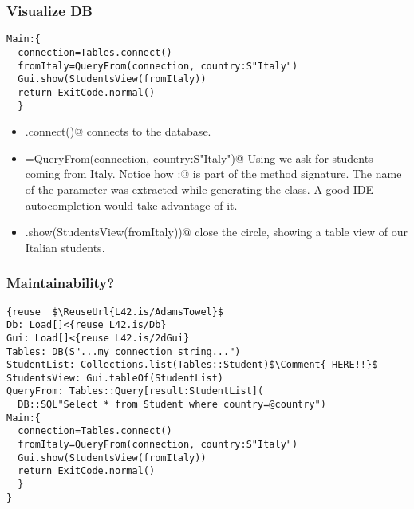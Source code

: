 \begin{frame}[fragile]
\frametitle{Visualize DB}
\begin{NiceCode}{59ex}{1}
\begin{lstlisting}
Main:{
  connection=Tables.connect()
  fromItaly=QueryFrom(connection, country:S"Italy")
  Gui.show(StudentsView(fromItaly))
  return ExitCode.normal()
  }
\end{lstlisting}
\end{NiceCode}
\begin{itemize}
\item \Q@Tables.connect()@ connects to the database.
\item\Q@fromItaly=QueryFrom(connection, country:S"Italy")@
Using \Q@QueryForm@ we ask for students coming from Italy.
Notice how \Q@country:@ is part of the method signature.
The name of the parameter was extracted while generating the class.
A good IDE autocompletion would take advantage of it.
\item\Q@Gui.show(StudentsView(fromItaly))@
close the circle, showing a table view of our Italian students.

\end{itemize}
\end{frame}


\begin{frame}[fragile]
\frametitle{Maintainability?}
\begin{NiceCode}{59ex}{1}
\begin{lstlisting}
{reuse  $\ReuseUrl{L42.is/AdamsTowel}$
Db: Load[]<{reuse L42.is/Db}
Gui: Load[]<{reuse L42.is/2dGui}
Tables: DB(S"...my connection string...")
StudentList: Collections.list(Tables::Student)$\Comment{ HERE!!}$
StudentsView: Gui.tableOf(StudentList)
QueryFrom: Tables::Query[result:StudentList](
  DB::SQL"Select * from Student where country=@country")
Main:{
  connection=Tables.connect()
  fromItaly=QueryFrom(connection, country:S"Italy")
  Gui.show(StudentsView(fromItaly))
  return ExitCode.normal()
  }
}
\end{lstlisting}
\end{NiceCode}
\end{frame}
